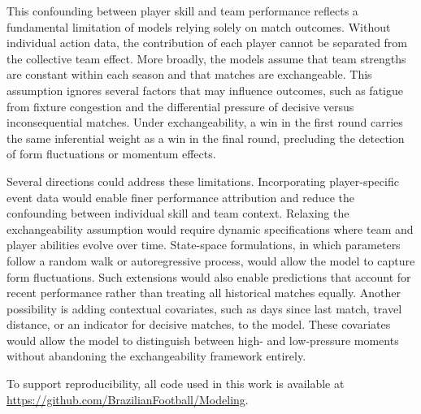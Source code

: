 This confounding between player skill and team performance reflects a fundamental limitation of models relying solely on match outcomes.
Without individual action data, the contribution of each player cannot be separated from the collective team effect.
More broadly, the models assume that team strengths are constant within each season and that matches are exchangeable.
This assumption ignores several factors that may influence outcomes, such as fatigue from fixture congestion and the differential pressure of decisive versus inconsequential matches.
Under exchangeability, a win in the first round carries the same inferential weight as a win in the final round, precluding the detection of form fluctuations or momentum effects.

Several directions could address these limitations.
Incorporating player-specific event data would enable finer performance attribution and reduce the confounding between individual skill and team context.
Relaxing the exchangeability assumption would require dynamic specifications where team and player abilities evolve over time.
State-space formulations, in which parameters follow a random walk or autoregressive process, would allow the model to capture form fluctuations.
Such extensions would also enable predictions that account for recent performance rather than treating all historical matches equally.
Another possibility is adding contextual covariates, such as days since last match, travel distance, or an indicator for decisive matches, to the model.
These covariates would allow the model to distinguish between high- and low-pressure moments without abandoning the exchangeability framework entirely.

To support reproducibility, all code used in this work is available at \url{https://github.com/BrazilianFootball/Modeling}.
